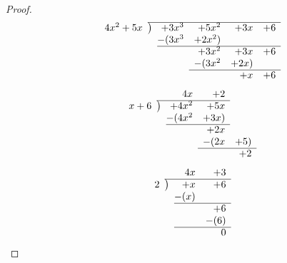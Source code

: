 \documentclass[paper=usletter, fontsize=12pt]{article}
\begin{document}
\begin{enumerate}
\begin{enumerate}
\begin{enumerate}
\begin{proof}
\begin{equation*}
\begin{array}{*2r @{\hskip\arraycolsep}c@{\hskip\arraycolsep} *5r}
                            \cline{3-7}
                            & 4x^2 +5x &\big)& +3x^3 &+5x^2 &+3x &+6 \\
                            &    &&  -(3x^3 &+2x^2) \\
                            \cline{4-7}
                            &    &&   &  +3x^2 &+3x &+6 \\
                            &    &&   &  -(3x^2 &+2x) \\
                            \cline{5-7}
                            &    &&    &    & +x & +6 \\
                        \end{array}
                    \end{equation*}
                    \begin{equation*}
                        \begin{array}{*2r @{\hskip\arraycolsep}c@{\hskip\arraycolsep} *4r}
                            &    &&    4x & +2 \\
                            \cline{3-5}
                            & x+6 &\big)& +4x^2 &+5x \\
                            &    &&  -(4x^2 &+3x) \\
                            \cline{4-5}
                            &    &&   &  +2x \\
                            &    &&   &  -(2x &+5) \\
                            \cline{5-6}
                            &    &&    &    & +2 \\
                        \end{array}
                    \end{equation*}
                    \begin{equation*}
                        \begin{array}{*2r @{\hskip\arraycolsep}c@{\hskip\arraycolsep} *3r}
                            &    &&    4x & +3 \\
                            \cline{3-5}
                            & 2 &\big)& +x &+6 \\
                            &    &&  -(x) \\
                            \cline{4-5}
                            &    &&   &  +6 \\
                            &    &&   &  -(6) \\
                            \cline{4-5}
                            &    &&    & 0 \\
                        \end{array}
                    \end{equation*}


\end{proof}
\end{enumerate}
\end{enumerate}
\end{enumerate}
\end{document}

